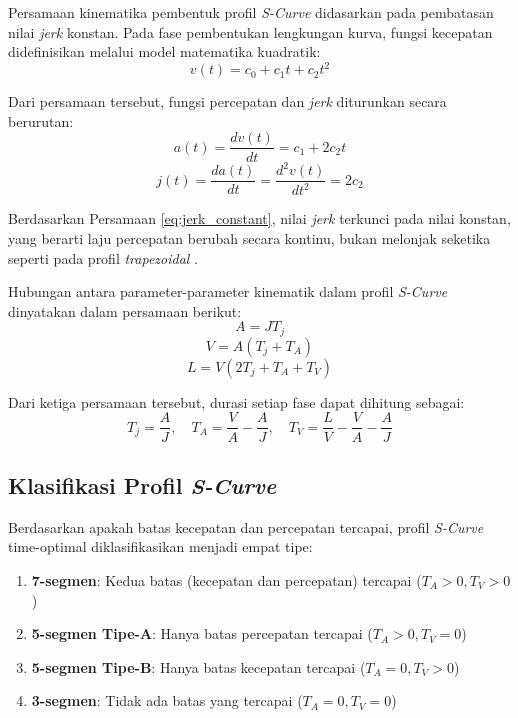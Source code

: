 Persamaan kinematika pembentuk profil \textit{S-Curve} didasarkan pada
pembatasan nilai \textit{jerk} konstan. Pada fase pembentukan lengkungan kurva,
fungsi kecepatan didefinisikan melalui model matematika kuadratik:
\begin{equation}
v(t) = c_0 + c_1t + c_2t^2
\label{eq:velocity_quadratic}
\end{equation}

Dari persamaan tersebut, fungsi percepatan dan \textit{jerk} diturunkan secara berurutan:
\begin{equation}
a(t) = \frac{dv(t)}{dt} = c_1 + 2c_2t
\label{eq:acceleration}
\end{equation}
\begin{equation}
j(t) = \frac{da(t)}{dt} = \frac{d^2v(t)}{dt^2} = 2c_2
\label{eq:jerk_constant}
\end{equation}

Berdasarkan Persamaan \ref{eq:jerk_constant}, nilai \textit{jerk} terkunci pada nilai konstan, yang berarti laju percepatan berubah secara kontinu, bukan melonjak seketika seperti pada profil \textit{trapezoidal} \parencite{9310134}.

Hubungan antara parameter-parameter kinematik dalam profil \textit{S-Curve} dinyatakan dalam persamaan berikut:
\begin{equation}
A = JT_j
\label{eq:A_J}
\end{equation}
\begin{equation}
V = A(T_j + T_A)
\label{eq:V_A}
\end{equation}
\begin{equation}
L = V(2T_j + T_A + T_V)
\label{eq:L_V}
\end{equation}

Dari ketiga persamaan tersebut, durasi setiap fase dapat dihitung sebagai:
\begin{equation}
T_j = \frac{A}{J}, \quad T_A = \frac{V}{A} - \frac{A}{J}, \quad T_V = \frac{L}{V} - \frac{V}{A} - \frac{A}{J}
\label{eq:time_params}
\end{equation}

\subsection{Klasifikasi Profil \textit{S-Curve}}

Berdasarkan apakah batas kecepatan dan percepatan tercapai, profil \textit{S-Curve} time-optimal diklasifikasikan menjadi empat tipe:

\begin{enumerate}
    \item \textbf{7-segmen}: Kedua batas (kecepatan dan percepatan) tercapai (\(T_A > 0, T_V > 0\))
    \item \textbf{5-segmen Tipe-A}: Hanya batas percepatan tercapai (\(T_A > 0, T_V = 0\))
    \item \textbf{5-segmen Tipe-B}: Hanya batas kecepatan tercapai (\(T_A = 0, T_V > 0\))
    \item \textbf{3-segmen}: Tidak ada batas yang tercapai (\(T_A = 0, T_V = 0\))
\end{enumerate}

